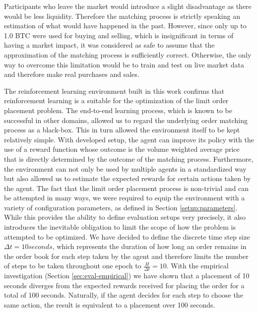    Participants who leave the market would introduce a slight disadvantage as there would be less liquidity.
    Therefore the matching process is strictly speaking an estimation of what would have happened in the past.
    However, since only up to 1.0 BTC were used for buying and selling, which is insignificant in terms of having a market impact\cite{hautsch2012market}, it was considered as safe to assume that the approximation of the matching process is sufficiently correct.
    Otherwise, the only way to overcome this limitation would be to train and test on live market data and therefore make real purchases and sales.
    
    The reinforcement learning environment built in this work confirms that reinforcement learning is a suitable for the optimization of the limit order placement problem.
    The end-to-end learning process, which is known to be successful in other domains\cite{amodei2016deep, mnih2015human, mnih2013playing}, allowed us to regard the underlying order matching process as a black-box.
    This in turn allowed the environment itself to be kept relatively simple.
    With developed setup, the agent can improve its policy with the use of a reward function whose outcome is the volume weighted average price that is directly determined by the outcome of the matching process.
    Furthermore, the environment can not only be used by multiple agents in a standardized way but also allowed us to estimate the expected rewards for certain actions taken by the agent.
    The fact that the limit order placement process is non-trivial and can be attempted in many ways, we were required to equip the environment with a variety of configuration parameters, as defined in Section \ref{setup:parameters}.
    While this provides the ability to define evaluation setups very precisely, it also introduces the inevitable obligation to limit the scope of how the problem is attempted to be optimized.
    We have decided to define the discrete time step size $\Delta{t}=10 seconds$, which represents the duration of how long an order remains in the order book for each step taken by the agent and therefore limits the number of steps to be taken throughout one epoch to $\frac{H}{\Delta{t}}=10$.
    With the empirical investigation (Section \ref{sec:eval-empirical}) we have shown that a placement of 10 seconds diverges from the expected rewards received for placing the order for a total of 100 seconds.
    Naturally, if the agent decides for each step to choose the same action, the result is equivalent to a placement over 100 seconds.
